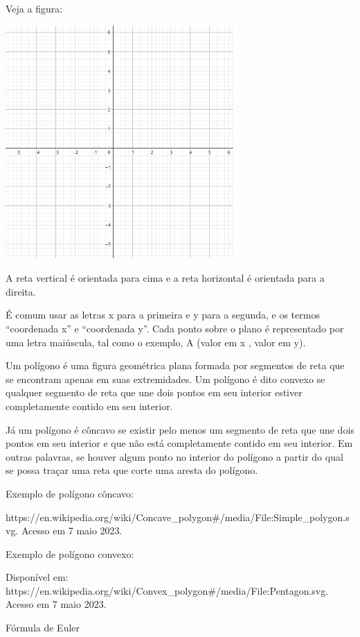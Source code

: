 Veja a figura:

\includegraphics[width=3.42575in,height=3.5in]{./imgSAEB_6_MAT/media/image39.png}

A reta vertical é orientada para cima e a reta horizontal é orientada
para a direita.

É comum usar as letras x para a primeira e y para a segunda, e os termos
``coordenada x'' e ``coordenada y''. Cada ponto sobre o plano é
representado por uma letra maiúscula, tal como o exemplo, A (valor em x
, valor em y).

Um polígono é uma figura geométrica plana formada por segmentos de reta
que se encontram apenas em suas extremidades. Um polígono é dito convexo
se qualquer segmento de reta que une dois pontos em seu interior estiver
completamente contido em seu interior.

Já um polígono é côncavo se existir pelo menos um segmento de reta que
une dois pontos em seu interior e que não está completamente contido em
seu interior. Em outras palavras, se houver algum ponto no interior do
polígono a partir do qual se possa traçar uma reta que corte uma aresta
do polígono.

Exemplo de polígono côncavo:

https://en.wikipedia.org/wiki/Concave\_polygon\#/media/File:Simple\_polygon.svg.
Acesso em 7 maio 2023.

Exemplo de polígono convexo:


Disponível em:
https://en.wikipedia.org/wiki/Convex\_polygon\#/media/File:Pentagon.svg.
Acesso em 7 maio 2023.

Fórmula de Euler

